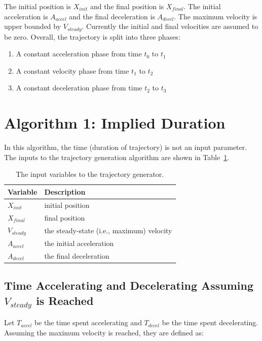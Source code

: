 \documentclass[11pt]{article} %
\begin{document}
 \noindent The initial position is $X_{init}$ and the final position is $X_{final}$. The initial acceleration is $A_{accel}$ and the final deceleration is $A_{decel}$. The maximum velocity is upper bounded by $V_{steady}$. Currently the initial and final velocities are assumed to be zero. Overall, the trajectory is split into three phases:

\begin{enumerate}
\item A constant acceleration phase from time $t_0$ to $t_1$
\item A constant velocity phase from time $t_1$ to $t_2$
\item A constant deceleration phase from time $t_2$ to $t_3$
\end{enumerate}

\section{Algorithm 1: Implied Duration}
In this algorithm, the time (duration of trajectory) is not an input parameter. The inputs to the trajectory generation algorithm are shown in Table~\ref{table:inputs}.

\begin{table}[tbh]
  \centering
  \begin{tabular}{|l|l|}
   \hline
    \textbf{Variable}                  & \textbf{Description} \\
    \hline
    $X_{init}$         & initial position \\
    $X_{final}$      & final position \\
    $V_{steady}$  & the steady-state (i.e., maximum) velocity \\
    $A_{accel}$     & the initial acceleration \\
    $A_{decel}$  & the final deceleration \\
  \hline
  \end{tabular}
  \vspace{1mm}
  \caption{The input variables to the trajectory generator.}
  \label{table:inputs}
\end{table}

\subsection{Time Accelerating and Decelerating Assuming $V_{steady}$ is Reached}

Let $T_{accel}$ be the time spent accelerating and $T_{decel}$ be the time spent decelerating. Assuming the maximum velocity is reached, they are defined as:
\end{document}
